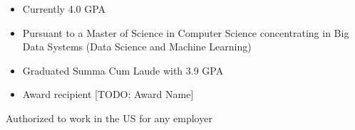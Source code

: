 \documentclass[10pt,a4paper,ragged2e,landscape]{altacv}
\begin{document}
\begin{itemize}
  \item Currently 4.0 GPA
  \item Pursuant to a Master of Science in Computer Science concentrating in Big Data
        Systems (Data Science and Machine Learning)
\end{itemize}
\divider
{}
\begin{itemize}
  \item  Graduated Summa Cum Laude with 3.9 GPA
  \item  Award recipient [TODO: Award Name]
\end{itemize}

\clearpage
\begin{minipage}[]{28cm}
  \begin{minipage}{9cm}
  \end{minipage}
  \hfill
  \begin{minipage}{9cm}
  \end{minipage}
  \hfill
  \begin{minipage}{9cm}
  \end{minipage}
  \begin{center}
    Authorized to work in the US for any employer
  \end{center}
\end{minipage}
\end{document}

